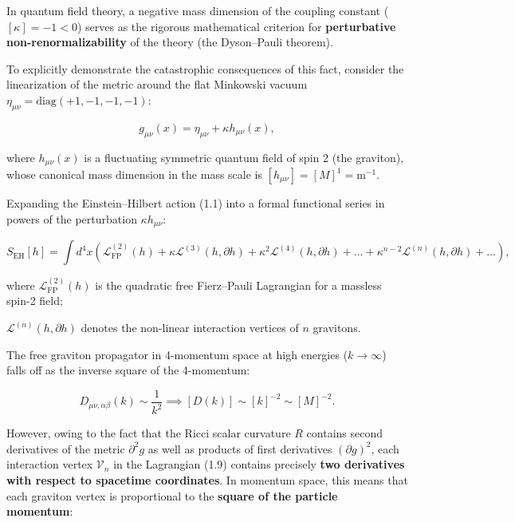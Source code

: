 In quantum field theory, a negative mass dimension of the coupling constant ($[\kappa] = -1 < 0$) serves as the rigorous mathematical criterion for \textbf{perturbative non-renormalizability} of the theory (the Dyson--Pauli theorem).

To explicitly demonstrate the catastrophic consequences of this fact, consider the linearization of the metric around the flat Minkowski vacuum $\eta_{\mu\nu} = \text{diag}(+1, -1, -1, -1)$:

\begin{equation}\label{eq:1.8}\tag{1.8}
g_{\mu\nu}(x) = \eta_{\mu\nu} + \kappa h_{\mu\nu}(x),
\end{equation}

where $h_{\mu\nu}(x)$ is a fluctuating symmetric quantum field of spin 2 (the graviton), whose canonical mass dimension in the mass scale is $[h_{\mu\nu}] = [M]^1 = \text{m}^{-1}$.

Expanding the Einstein--Hilbert action (1.1) into a formal functional series in powers of the perturbation $\kappa h_{\mu\nu}$:

\begin{equation}\label{eq:1.9}\tag{1.9}
S_{\text{EH}}[h] = \int d^4x \left( \mathcal{L}^{(2)}_{\text{FP}}(h) + \kappa \mathcal{L}^{(3)}(h, \partial h) + \kappa^2 \mathcal{L}^{(4)}(h, \partial h) + \dots + \kappa^{n-2} \mathcal{L}^{(n)}(h, \partial h) + \dots \right),
\end{equation}

where $\mathcal{L}^{(2)}_{\text{FP}}(h)$ is the quadratic free Fierz--Pauli Lagrangian for a massless spin-2 field;  

$\mathcal{L}^{(n)}(h, \partial h)$ denotes the non-linear interaction vertices of $n$ gravitons.

The free graviton propagator in 4-momentum space at high energies ($k \to \infty$) falls off as the inverse square of the 4-momentum:

\begin{equation}\label{eq:1.10}\tag{1.10}
D_{\mu\nu,\alpha\beta}(k) \sim \frac{1}{k^2} \implies [D(k)] \sim [k]^{-2} \sim [M]^{-2}.
\end{equation}

However, owing to the fact that the Ricci scalar curvature $R$ contains second derivatives of the metric $\partial^2 g$ as well as products of first derivatives $(\partial g)^2$, each interaction vertex $\mathcal{V}_n$ in the Lagrangian (1.9) contains precisely \textbf{two derivatives with respect to spacetime coordinates}. In momentum space, this means that each graviton vertex is proportional to the \textbf{square of the particle momentum}:

